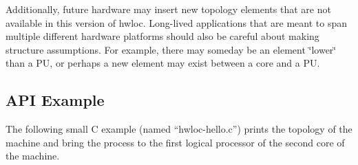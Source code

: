 Additionally, future hardware may insert new topology elements that are not available in this version of hwloc. Long-\/lived applications that are meant to span multiple different hardware platforms should also be careful about making structure assumptions. For example, there may someday be an element \char`\"{}lower\char`\"{} than a PU, or perhaps a new element may exist between a core and a PU.\hypertarget{index_interface_example}{}\subsection{API Example}\label{index_interface_example}
The following small C example (named ``hwloc-\/hello.c'') prints the topology of the machine and bring the process to the first logical processor of the second core of the machine.



